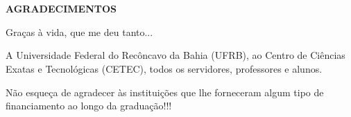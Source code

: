 \chapter*{}
\vspace{-4cm}
\begin{center}
 \textbf{AGRADECIMENTOS}
\end{center}

\vspace{0.5cm}
Graças à vida, que me deu tanto...

A Universidade Federal do Recôncavo da Bahia (UFRB), ao Centro de Ciências Exatas e Tecnológicas (CETEC), todos os servidores, professores e alunos.

Não esqueça de agradecer às instituições que lhe forneceram algum tipo de financiamento ao longo da graduação!!!




